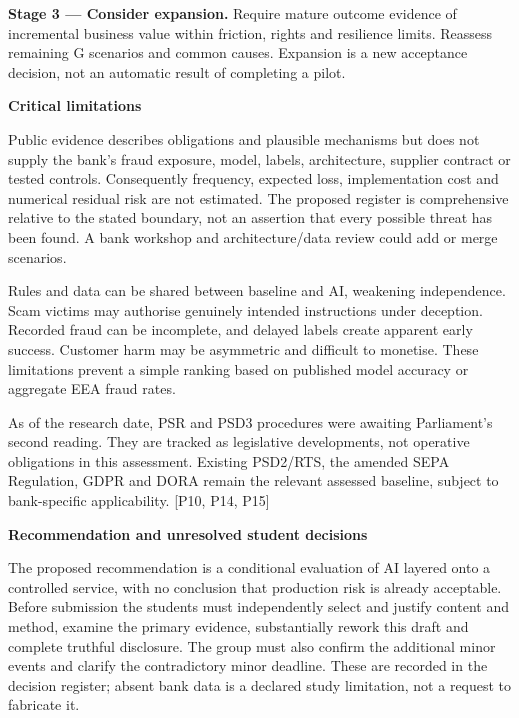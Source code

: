 \documentclass[11pt,a4paper]{article}
\newcommand{\sub}[1]{\par\vspace{2mm}\textbf{\color{ink}#1}\par}
\newcommand{\src}[1]{{\small[#1]}}
\begin{document}
\textbf{Stage 3 --- Consider expansion.} Require mature outcome evidence of incremental business value within friction, rights and resilience limits. Reassess remaining G scenarios and common causes. Expansion is a new acceptance decision, not an automatic result of completing a pilot.
\sub{Critical limitations}
Public evidence describes obligations and plausible mechanisms but does not supply the bank's fraud exposure, model, labels, architecture, supplier contract or tested controls. Consequently frequency, expected loss, implementation cost and numerical residual risk are not estimated. The proposed register is comprehensive relative to the stated boundary, not an assertion that every possible threat has been found. A bank workshop and architecture/data review could add or merge scenarios.

Rules and data can be shared between baseline and AI, weakening independence. Scam victims may authorise genuinely intended instructions under deception. Recorded fraud can be incomplete, and delayed labels create apparent early success. Customer harm may be asymmetric and difficult to monetise. These limitations prevent a simple ranking based on published model accuracy or aggregate EEA fraud rates.

As of the research date, PSR and PSD3 procedures were awaiting Parliament's second reading. They are tracked as legislative developments, not operative obligations in this assessment. Existing PSD2/RTS, the amended SEPA Regulation, GDPR and DORA remain the relevant assessed baseline, subject to bank-specific applicability. \src{P10, P14, P15}
\sub{Recommendation and unresolved student decisions}
The proposed recommendation is a conditional evaluation of AI layered onto a controlled service, with no conclusion that production risk is already acceptable. Before submission the students must independently select and justify content and method, examine the primary evidence, substantially rework this draft and complete truthful disclosure. The group must also confirm the additional minor events and clarify the contradictory minor deadline. These are recorded in the decision register; absent bank data is a declared study limitation, not a request to fabricate it.
\end{document}
